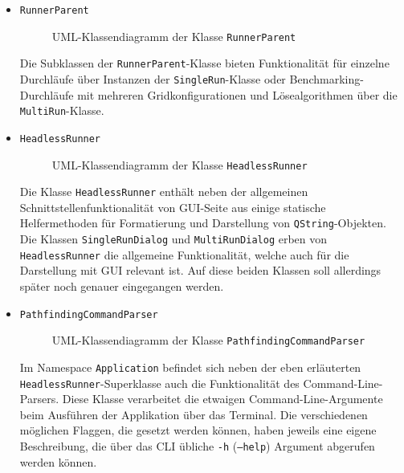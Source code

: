 \begin{itemize}
    \item \texttt{RunnerParent}\\
    \begin{figure}[H]
        \vspace{-0.5cm}
        \centering
        
        \caption{UML-Klassendiagramm der Klasse \texttt{RunnerParent}}
        \label{fig:uml_runner_parent}
    \end{figure}
    Die Subklassen der \texttt{RunnerParent}-Klasse bieten Funktionalität für einzelne Durchläufe über Instanzen der \texttt{SingleRun}-Klasse
    oder Benchmarking-Durchläufe mit mehreren Gridkonfigurationen und Lösealgorithmen über die \texttt{MultiRun}-Klasse.

    \item \texttt{HeadlessRunner}\\
    \begin{figure}[H]
        \vspace{-0.5cm}
        \centering
        
        \caption{UML-Klassendiagramm der Klasse \texttt{HeadlessRunner}}
        \label{fig:uml_headlessRunner}
    \end{figure}
    Die Klasse \texttt{HeadlessRunner} enthält neben der allgemeinen Schnittstellenfunktionalität von \ac{GUI}-Seite aus
    einige statische Helfermethoden für Formatierung und Darstellung von \texttt{QString}-Objekten.
    Die Klassen \texttt{Single\-RunDialog} und \texttt{MultiRunDialog} erben von \texttt{HeadlessRunner} die allgemeine Funktionalität,
    welche auch für die Darstellung mit \ac{GUI} relevant ist.
    Auf diese beiden Klassen soll allerdings später noch genauer eingegangen werden.

    \item \texttt{PathfindingCommandParser}
    \begin{figure}[H]
        \vspace{-0.5cm}
        \centering
        
        \caption{UML-Klassendiagramm der Klasse \texttt{PathfindingCommandParser}}
        \label{fig:uml_commandlineparser}
    \end{figure}
    Im Namespace \texttt{Application} befindet sich neben der eben erläuterten \\ \texttt{HeadlessRunner}-Superklasse auch die
    Funktionalität des Command-Line-Parsers.
    Diese Klasse verarbeitet die etwaigen Command-Line-Argumente beim Ausführen der Applikation über das Terminal.
    Die verschiedenen möglichen Flaggen, die gesetzt werden können, haben jeweils eine eigene Beschreibung, die über
    das \ac{CLI} übliche \texttt{-h} (\texttt{--help}) Argument abgerufen werden können.
\end{itemize}
